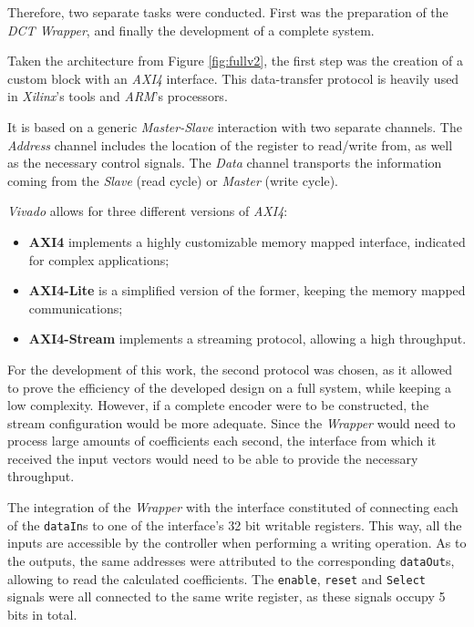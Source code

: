 Therefore, two separate tasks were conducted. First was the preparation of the \emph{DCT Wrapper}, and finally the development of a complete system.


Taken the architecture from Figure \ref{fig:fullv2}, the first step was the creation of a custom block with an \emph{AXI4} interface. This data-transfer protocol is heavily used in \emph{Xilinx}'s tools and \emph{ARM}'s processors.

It is based on a generic \emph{Master-Slave} interaction with two separate channels. The \emph{Address} channel includes the location of the register to read/write from, as well as the necessary control signals. The \emph{Data} channel transports the information coming from the \emph{Slave} (read cycle) or \emph{Master} (write cycle). 

\emph{Vivado} allows for three different versions of \emph{AXI4}:

\begin{itemize}
    \item \textbf{AXI4} implements a highly customizable memory mapped interface, indicated for complex applications;
    \item \textbf{AXI4-Lite} is a simplified version of the former, keeping the memory mapped communications;
    \item \textbf{AXI4-Stream} implements a streaming protocol, allowing a high throughput.
\end{itemize}

For the development of this work, the second protocol was chosen, as it allowed to prove the efficiency of the developed design on a full system, while keeping a low complexity. However, if a complete encoder were to be constructed, the stream configuration would be more adequate. Since the \emph{Wrapper} would need to process large amounts of coefficients each second, the interface from which it received the input vectors would need to be able to provide the necessary throughput.

The integration of the \emph{Wrapper} with the interface constituted of connecting each of the \texttt{dataIn}s to one of the interface's 32 bit writable registers. This way, all the inputs are accessible by the controller when performing a writing operation. As to the outputs, the same addresses were attributed to the corresponding \texttt{dataOut}s, allowing to read the calculated coefficients. The \texttt{enable}, \texttt{reset} and \texttt{Select} signals were all connected to the same write register, as these signals occupy 5 bits in total.

